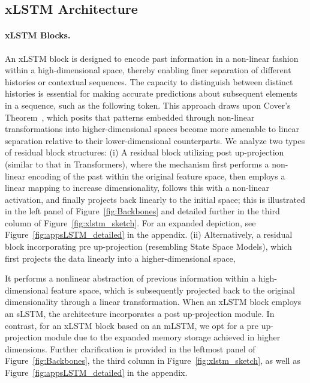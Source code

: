 \subsection{xLSTM Architecture}
\label{sec:xLSTMarch}

\paragraph{xLSTM Blocks.}
\label{sec:xLSTMblock}
An xLSTM block is designed to encode past information in a non-linear fashion within a high-dimensional space, thereby enabling finer separation of different histories or contextual sequences. The capacity to distinguish between distinct histories is essential for making accurate predictions about subsequent elements in a sequence, such as the following token. This approach draws upon Cover’s Theorem~\citep{Cover:65}, which posits that patterns embedded through non-linear transformations into higher-dimensional spaces become more amenable to linear separation relative to their lower-dimensional counterparts. We analyze two types of residual block structures: (i) A residual block utilizing post up-projection (similar to that in Transformers), where the mechanism first performs a non-linear encoding of the past within the original feature space, then employs a linear mapping to increase dimensionality, follows this with a non-linear activation, and finally projects back linearly to the initial space; this is illustrated in the left panel of Figure~\ref{fig:Backbones} and detailed further in the third column of Figure~\ref{fig:xlstm_sketch}. For an expanded depiction, see Figure~\ref{fig:appsLSTM_detailed} in the appendix. (ii) Alternatively, a residual block incorporating pre up-projection (resembling State Space Models), which first projects the data linearly into a higher-dimensional space,

It performs a nonlinear abstraction of previous information within a high-dimensional feature space, which is subsequently projected back to the original dimensionality through a linear transformation. When an xLSTM block employs an sLSTM, the architecture incorporates a post up-projection module. In contrast, for an xLSTM block based on an mLSTM, we opt for a pre up-projection module due to the expanded memory storage achieved in higher dimensions. Further clarification is provided in the leftmost panel of Figure~\ref{fig:Backbones}, the third column in Figure~\ref{fig:xlstm_sketch}, as well as Figure~\ref{fig:appsLSTM_detailed} in the appendix.

